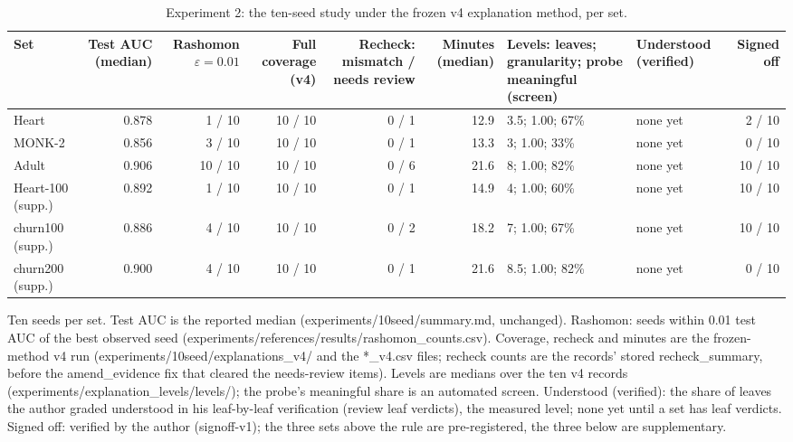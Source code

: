 \begin{table}[htbp]
\centering
\small
\caption{Experiment 2: the ten-seed study under the frozen v4 explanation method, per set.}
\label{tab:ch7-exp2-consistency}
\begin{tabular}{lrrrrrp{3.0cm}p{1.6cm}r}
\toprule
Set & Test AUC (median) & Rashomon $\varepsilon=0.01$ & Full coverage (v4) & Recheck: mismatch / needs review & Minutes (median) & Levels: leaves; granularity; probe meaningful (screen) & Understood (verified) & Signed off \\
\midrule
Heart & 0.878 & 1 / 10 & 10 / 10 & 0 / 1 & 12.9 & 3.5; 1.00; 67\% & none yet & 2 / 10 \\
MONK-2 & 0.856 & 3 / 10 & 10 / 10 & 0 / 1 & 13.3 & 3; 1.00; 33\% & none yet & 0 / 10 \\
Adult & 0.906 & 10 / 10 & 10 / 10 & 0 / 6 & 21.6 & 8; 1.00; 82\% & none yet & 10 / 10 \\
\midrule
Heart-100 (supp.) & 0.892 & 1 / 10 & 10 / 10 & 0 / 1 & 14.9 & 4; 1.00; 60\% & none yet & 10 / 10 \\
churn100 (supp.) & 0.886 & 4 / 10 & 10 / 10 & 0 / 2 & 18.2 & 7; 1.00; 67\% & none yet & 10 / 10 \\
churn200 (supp.) & 0.900 & 4 / 10 & 10 / 10 & 0 / 1 & 21.6 & 8.5; 1.00; 82\% & none yet & 0 / 10 \\
\bottomrule
\end{tabular}
\begin{flushleft}\footnotesize Ten seeds per set. Test AUC is the reported median (experiments/10seed/summary.md, unchanged). Rashomon: seeds within 0.01 test AUC of the best observed seed (experiments/references/results/rashomon\_counts.csv). Coverage, recheck and minutes are the frozen-method v4 run (experiments/10seed/explanations\_v4/ and the *\_v4.csv files; recheck counts are the records' stored recheck\_summary, before the amend\_evidence fix that cleared the needs-review items). Levels are medians over the ten v4 records (experiments/explanation\_levels/levels/); the probe's meaningful share is an automated screen. Understood (verified): the share of leaves the author graded understood in his leaf-by-leaf verification (review leaf verdicts), the measured level; none yet until a set has leaf verdicts. Signed off: verified by the author (signoff-v1); the three sets above the rule are pre-registered, the three below are supplementary.\end{flushleft}
\end{table}
